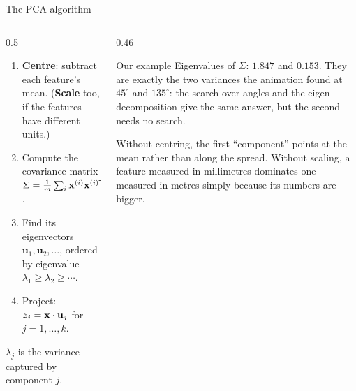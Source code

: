 \documentclass[aspectratio=169,10pt]{beamer}
\begin{document}
\begin{frame}{The PCA algorithm}
  \begin{columns}[T,onlytextwidth]
    \begin{column}{0.5\textwidth}
      \begin{defnbox}
        \small
        \begin{enumerate}
          \item \textbf{Centre}: subtract each feature's mean. (\textbf{Scale} too, if the
                features have different units.)
          \item Compute the covariance matrix
                $\Sigma = \frac1m\sum_i \mathbf{x}^{(i)}\mathbf{x}^{(i)\mathsf T}$.
          \item Find its eigenvectors $\mathbf{u}_1,\mathbf{u}_2,\dots$, ordered by
                eigenvalue $\lambda_1 \ge \lambda_2 \ge \cdots$.
          \item Project: $z_j = \mathbf{x}\cdot\mathbf{u}_j$ for $j = 1,\dots,k$.
        \end{enumerate}
        $\lambda_j$ is the variance captured by component $j$.
      \end{defnbox}
    \end{column}
    \begin{column}{0.46\textwidth}
      \footnotesize
      \begin{block}{Our example}
        Eigenvalues of $\Sigma$: $1.847$ and $0.153$. They are exactly the two variances the
        animation found at $45^\circ$ and $135^\circ$: the search over angles and the
        eigen-decomposition give the same answer, but the second needs no search.
      \end{block}
      \begin{pitfall}
        \footnotesize Without centring, the first ``component'' points at the mean rather
        than along the spread. Without scaling, a feature measured in millimetres
        dominates one measured in metres simply because its numbers are bigger.
      \end{pitfall}
    \end{column}
  \end{columns}
\end{frame}
\end{document}
